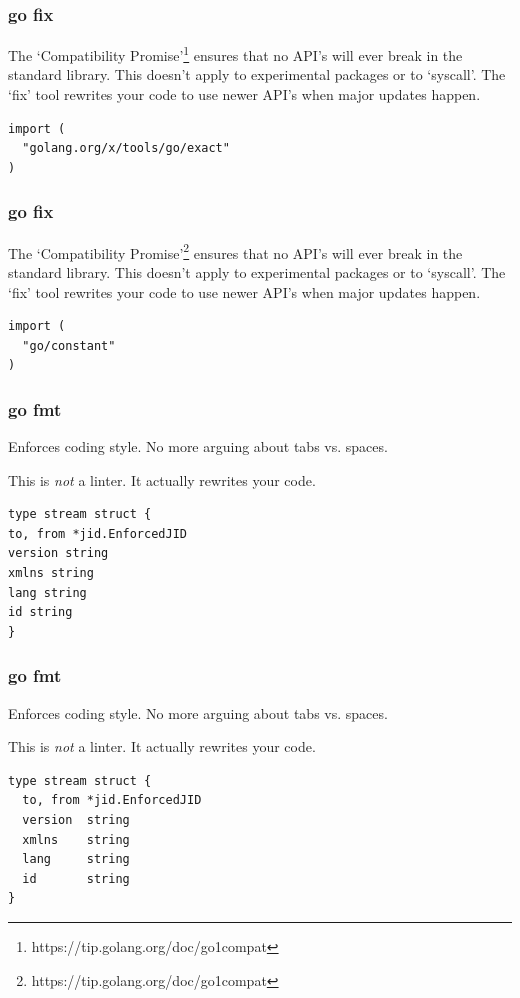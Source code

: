 \documentclass[xelatex,aspectratio=169]{beamer}
\begin{document}
\begin{frame}[fragile]
	\frametitle{go fix}
	\begin{flushleft}
		The `Compatibility Promise'\footnote{https://tip.golang.org/doc/go1compat}
		ensures that no API's will ever break in the standard library. This doesn't
		apply to experimental packages or to `syscall'. The `fix' tool rewrites your
		code to use newer API's when major updates happen.
	\end{flushleft}
\begin{verbatim}
import (
  "golang.org/x/tools/go/exact"
)
\end{verbatim}
\end{frame}

\begin{frame}[fragile]
	\frametitle{go fix}
	\begin{flushleft}
		The `Compatibility Promise'\footnote{https://tip.golang.org/doc/go1compat}
		ensures that no API's will ever break in the standard library. This doesn't
		apply to experimental packages or to `syscall'. The `fix' tool rewrites your
		code to use newer API's when major updates happen.
	\end{flushleft}
\begin{verbatim}
import (
  "go/constant"
)
\end{verbatim}
\end{frame}

\begin{frame}[fragile]
	\frametitle{go fmt}
	\begin{flushleft}
		Enforces coding style. No more arguing about tabs vs. spaces.
	\end{flushleft}
	\begin{flushleft}
		This is \emph{not} a linter. It actually rewrites your code.
	\end{flushleft}
\begin{verbatim}
type stream struct {
to, from *jid.EnforcedJID
version string
xmlns string
lang string
id string
}
\end{verbatim}
\end{frame}
\begin{frame}[fragile]
	\frametitle{go fmt}
	\begin{flushleft}
		Enforces coding style. No more arguing about tabs vs. spaces.
	\end{flushleft}
	\begin{flushleft}
		This is \emph{not} a linter. It actually rewrites your code.
	\end{flushleft}
\begin{verbatim}
type stream struct {
  to, from *jid.EnforcedJID
  version  string
  xmlns    string
  lang     string
  id       string
}
\end{verbatim}
\end{frame}
\end{document}
